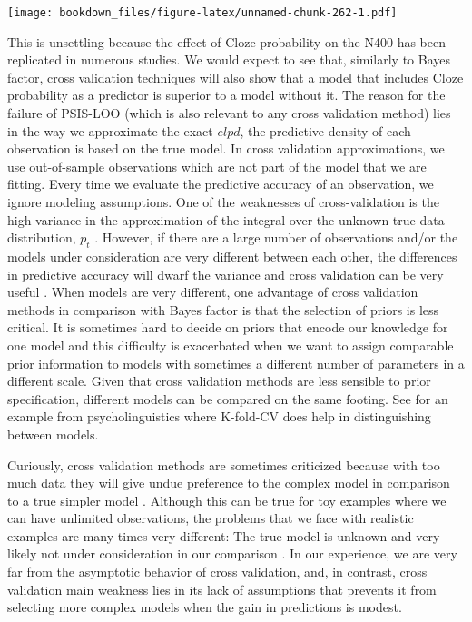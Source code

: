 \documentclass[12pt,]{krantz}
\theoremstyle{definition}
\theoremstyle{definition}
\theoremstyle{definition}
\theoremstyle{remark}
\begin{document}
\texttt{[image: bookdown\_files/figure-latex/unnamed-chunk-262-1.pdf]}

This is unsettling because the effect of Cloze probability on the N400
has been replicated in numerous studies. We would expect to see that,
similarly to Bayes factor, cross validation techniques will also show
that a model that includes Cloze probability as a predictor is superior
to a model without it. The reason for the failure of PSIS-LOO (which is
also relevant to any cross validation method) lies in the way we
approximate the exact \(elpd\), the predictive density of each
observation is based on the true model. In cross validation
approximations, we use out-of-sample observations which are not part of
the model that we are fitting. Every time we evaluate the predictive
accuracy of an observation, we ignore modeling assumptions. One of the
weaknesses of cross-validation is the high variance in the approximation
of the integral over the unknown true data distribution, \(p_t\)
\citep[section 4.5]{VehtariOjanen2012}. However, if there are a large
number of observations and/or the models under consideration are very
different between each other, the differences in predictive accuracy
will dwarf the variance and cross validation can be very useful
\citep[see also][]{piironenComparisonBayesianPredictive2017}. When
models are very different, one advantage of cross validation methods in
comparison with Bayes factor is that the selection of priors is less
critical. It is sometimes hard to decide on priors that encode our
knowledge for one model and this difficulty is exacerbated when we want
to assign comparable prior information to models with sometimes a
different number of parameters in a different scale. Given that cross
validation methods are less sensible to prior specification, different
models can be compared on the same footing. See
\citet{nicenboimModelsRetrievalSentence2018} for an example from
psycholinguistics where K-fold-CV does help in distinguishing between
models.

Curiously, cross validation methods are sometimes criticized because
with too much data they will give undue preference to the complex model
in comparison to a true simpler model
\citep{gronauLimitationsBayesianLeaveOneOut2018}. Although this can be
true for toy examples where we can have unlimited observations, the
problems that we face with realistic examples are many times very
different: The true model is unknown and very likely not under
consideration in our comparison \citep[see
also][]{navarroDevilDeepBlue2018}. In our experience, we are very far
from the asymptotic behavior of cross validation, and, in contrast,
cross validation main weakness lies in its lack of assumptions that
prevents it from selecting more complex models when the gain in
predictions is modest.
\end{document}
